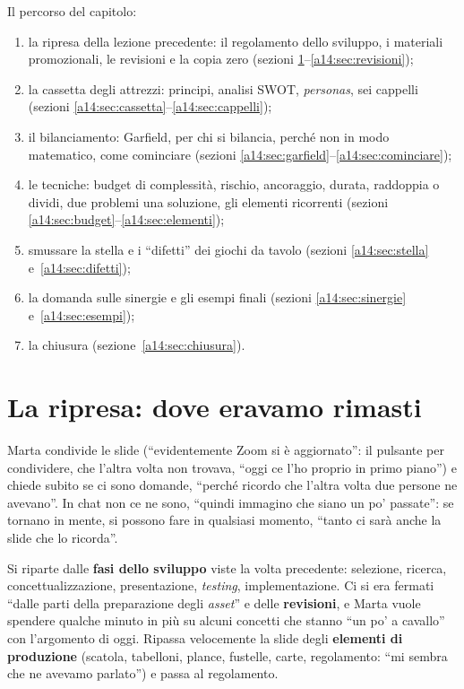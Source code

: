 Il percorso del capitolo:
\begin{enumerate}
  \item la ripresa della lezione precedente: il regolamento dello sviluppo, i materiali
        promozionali, le revisioni e la copia zero (sezioni
        \ref{a14:sec:ripresa}--\ref{a14:sec:revisioni});
  \item la cassetta degli attrezzi: principi, analisi SWOT, \emph{personas}, sei cappelli
        (sezioni \ref{a14:sec:cassetta}--\ref{a14:sec:cappelli});
  \item il bilanciamento: Garfield, per chi si bilancia, perché non in modo matematico,
        come cominciare (sezioni \ref{a14:sec:garfield}--\ref{a14:sec:cominciare});
  \item le tecniche: budget di complessità, rischio, ancoraggio, durata, raddoppia o
        dividi, due problemi una soluzione, gli elementi ricorrenti (sezioni
        \ref{a14:sec:budget}--\ref{a14:sec:elementi});
  \item smussare la stella e i ``difetti'' dei giochi da tavolo (sezioni
        \ref{a14:sec:stella} e~\ref{a14:sec:difetti});
  \item la domanda sulle sinergie e gli esempi finali (sezioni \ref{a14:sec:sinergie}
        e~\ref{a14:sec:esempi});
  \item la chiusura (sezione~\ref{a14:sec:chiusura}).
\end{enumerate}

\section{La ripresa: dove eravamo rimasti}
\label{a14:sec:ripresa}

Marta condivide le slide (``evidentemente Zoom si è aggiornato'': il pulsante per
condividere, che l'altra volta non trovava, ``oggi ce l'ho proprio in primo piano'') e
chiede subito se ci sono domande, ``perché ricordo che l'altra volta due persone ne
avevano''. In chat non ce ne sono, ``quindi immagino che siano un po' passate'': se tornano
in mente, si possono fare in qualsiasi momento, ``tanto ci sarà anche la slide che lo
ricorda''.

Si riparte dalle \textbf{fasi dello sviluppo} viste la volta precedente: selezione, ricerca,
concettualizzazione, presentazione, \emph{testing}, implementazione. Ci si era fermati
``dalle parti della preparazione degli \emph{asset}'' e delle \textbf{revisioni}, e Marta
vuole spendere qualche minuto in più su alcuni concetti che stanno ``un po' a cavallo'' con
l'argomento di oggi. Ripassa velocemente la slide degli \textbf{elementi di produzione}
(scatola, tabelloni, plance, fustelle, carte, regolamento: ``mi sembra che ne avevamo
parlato'') e passa al regolamento.

